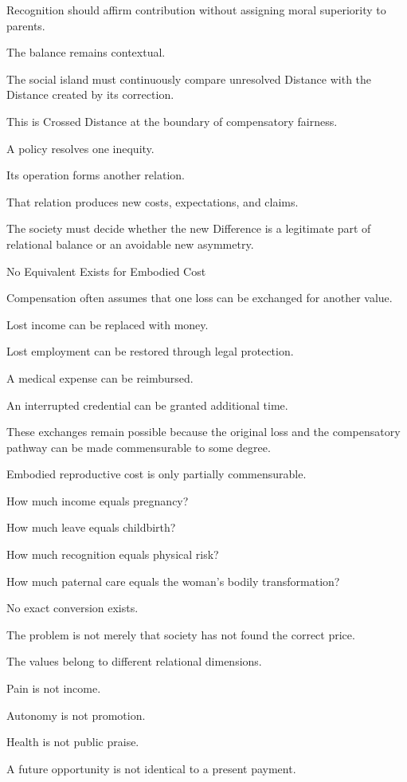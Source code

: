 Recognition should affirm contribution without assigning moral superiority to parents.

The balance remains contextual.

The social island must continuously compare unresolved Distance with the Distance created by its correction.

This is Crossed Distance at the boundary of compensatory fairness.

A policy resolves one inequity.

Its operation forms another relation.

That relation produces new costs, expectations, and claims.

The society must decide whether the new Difference is a legitimate part of relational balance or an avoidable new asymmetry.

No Equivalent Exists for Embodied Cost

Compensation often assumes that one loss can be exchanged for another value.

Lost income can be replaced with money.

Lost employment can be restored through legal protection.

A medical expense can be reimbursed.

An interrupted credential can be granted additional time.

These exchanges remain possible because the original loss and the compensatory pathway can be made commensurable to some degree.

Embodied reproductive cost is only partially commensurable.

How much income equals pregnancy?

How much leave equals childbirth?

How much recognition equals physical risk?

How much paternal care equals the woman’s bodily transformation?

No exact conversion exists.

The problem is not merely that society has not found the correct price.

The values belong to different relational dimensions.

Pain is not income.

Autonomy is not promotion.

Health is not public praise.

A future opportunity is not identical to a present payment.

